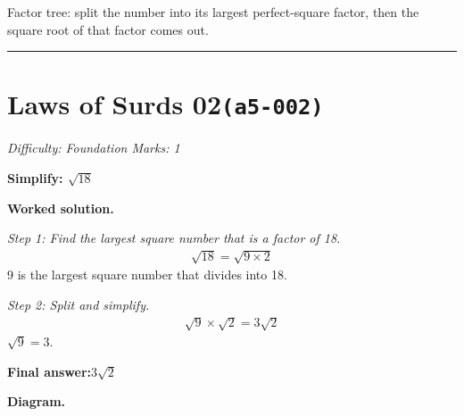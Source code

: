 \documentclass[11pt]{article}
\newcommand{\question}[1]{\par\medskip\noindent\textbf{#1}\par}
\begin{document}
\begin{center}
\end{center}
\small Factor tree: split the number into its largest perfect-square factor, then the square root of that factor comes out.\normalsize

\medskip\hrule

\section*{Laws of Surds 02\quad\small\texttt{(a5-002)}}
\textit{Difficulty: Foundation \quad\textbar\quad Marks: 1}

\question{Simplify: \( \sqrt{18} \)}

\textbf{Worked solution.}

\textit{Step 1: Find the largest square number that is a factor of 18.}
\[\begin{gathered}
\sqrt{18} = \sqrt{9 \times 2}
\end{gathered}\]
9 is the largest square number that divides into 18.

\textit{Step 2: Split and simplify.}
\[\begin{gathered}
\sqrt{9} \times \sqrt{2} = 3\sqrt{2}
\end{gathered}\]
\( \sqrt{9} = 3 \).

\begin{answerbox}
\textbf{Final answer:}\quad \(\displaystyle 3\sqrt{2}\)
\end{answerbox}
\textbf{Diagram.}
\end{document}
